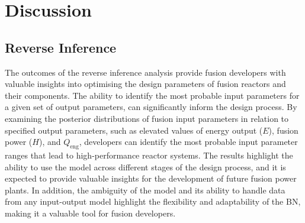 \documentclass[journal]{IEEEtran}
\begin{document}


\section{Discussion}\label{sec:Discussion}


\subsection{Reverse Inference}\label{sec:disc_reverse}

The outcomes of the reverse inference analysis provide fusion developers with valuable insights into optimising the design parameters of fusion reactors and their components. The ability to identify the most probable input parameters for a given set of output parameters, can significantly inform the design process. By examining the posterior distributions of fusion input parameters in relation to specified output parameters, such as elevated values of energy output ($E$), fusion power ($H$), and $Q_{\text{eng}}$, developers can identify the most probable input parameter ranges that lead to high-performance reactor systems. The results highlight the ability to use the model across different stages of the design process, and it is expected to provide valuable insights for the development of future fusion power plants. In addition, the ambiguity of the model and its ability to handle data from any input-output model highlight the flexibility and adaptability of the BN, making it a valuable tool for fusion developers.
\end{document}
